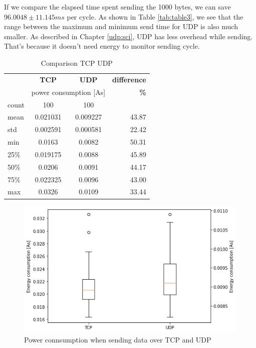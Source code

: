 If we compare the elapsed time spent sending the 1000 bytes,
we can save $96.0048 \pm 11.145 ms$ per cycle.
As shown in Table \ref{tab:table3},
we see that the range between the maximum and minimum send time for UDP is also much smaller.
As described in Chapter \ref{udp:sci}, UDP has less overhead while sending.
That's because it doesn't need energy to monitor sending cycle.
\begin{table}[H]
    \begin{center}
        \caption{Comparison TCP UDP}
        \label{tab:table4}
        \begin{tabular}{|l|c|c|r|}
            \hline
            & \textbf{TCP} & \textbf{{UDP}} & \textbf{difference} \\
            & \multicolumn{2}{c|}{ power consumption [As]} & \textbf{\%}\\
            \hline
            count & 100 & 100 & \\
            mean   & 0.021031 & 0.009227 & 43.87 \\
            std    & 0.002591 & 0.000581 & 22.42 \\
            min    & 0.0163 & 0.0082 & 50.31 \\
            25\%   & 0.019175 & 0.0088 & 45.89 \\
            50\%   & 0.0206 & 0.0091 & 44.17 \\
            75\%   & 0.022325 & 0.0096 & 43.00 \\
            max    & 0.0326 & 0.0109 & 33.44 \\
            \hline
        \end{tabular}
    \end{center}
\end{table}
\begin{figure}[H]
    \centering
    \includegraphics[width = 0.9 \linewidth]{fig/udp_tcp_power_consumption.png}
    \caption{Power connsumption when sending data over TCP and UDP}
    \label{fig:udp_tcp_boxplot_As}
    \end{figure}
